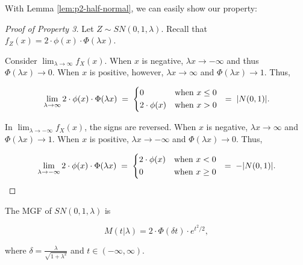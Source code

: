 \documentclass{article}
\begin{document}
With Lemma \ref{lem:p2-half-normal}, we can easily show our property:

\begin{proof}[Proof of Property 3]
  Let $Z \sim SN(0,1,\lambda)$. Recall that $f_Z(x) = 2 \cdot \phi(x) \cdot
  \Phi(\lambda x)$.

  Consider $\lim_{\lambda \to \infty} f_X(x)$. When $x$ is negative, $\lambda x
  \to -\infty$ and thus $\Phi(\lambda x) \to 0$. When $x$ is positive, however,
  $\lambda x \to \infty$ and $\Phi(\lambda x) \to 1$. Thus,

  \begin{equation}
    \label{eq:p2-positive-half-normal}
    \lim_{\lambda \to \infty} 2 \cdot \phi(x) \cdot \Phi(\lambda x) \eq
    \begin{dcases*}
      0 & when $x \leq 0$ \\
      2 \cdot \phi(x) & when $x > 0$
    \end{dcases*}
    \eq |N(0,1)|.
  \end{equation}

  In $\lim_{\lambda \to -\infty} f_X(x)$, the signs are reversed. When $x$ is
  negative, $\lambda x \to \infty$ and $\Phi(\lambda x) \to 1$. When $x$ is
  positive, $\lambda x \to -\infty$ and $\Phi(\lambda x) \to 0$. Thus,

  \begin{equation}
    \label{eq:p2-negative-half-normal}
    \lim_{\lambda \to -\infty} 2 \cdot \phi(x) \cdot \Phi(\lambda x) \eq
    \begin{dcases*}
      2 \cdot \phi(x) & when $x < 0$ \\
      0 & when $x \geq 0$
    \end{dcases*}
    \eq -|N(0,1)|.
  \end{equation}
\end{proof}


\begin{property} \label{prop:4}
  The MGF of $SN(0,1,\lambda)$ is

  \begin{equation} \label{eq:p4-sn-mgf}
    M(t|\lambda) = 2 \cdot \Phi (\delta t) \cdot e^{t^2/2},
  \end{equation}
    
  where $\delta = \frac{\lambda}{\sqrt{1 + \lambda^2}}$ and $t \in (-\infty, \infty)$.
\end{property}
\end{document}
